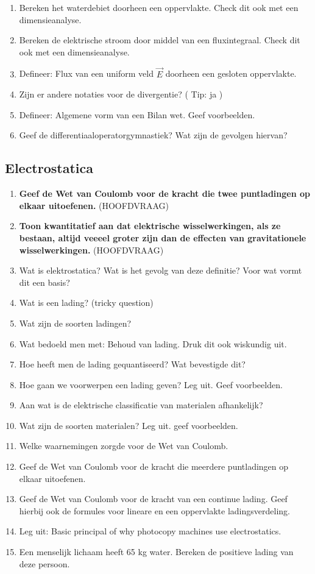 \documentclass[12pt]{article}
\begin{document}
\begin{enumerate}
        \item Bereken het waterdebiet doorheen een oppervlakte. Check dit ook met een dimensieanalyse.
        \item Bereken de elektrische stroom door middel van een fluxintegraal. Check dit ook met een dimensieanalyse.
        \item Defineer: Flux van een uniform veld $\vec{E}$ doorheen een gesloten oppervlakte.
        \item Zijn er andere notaties voor de divergentie? ( Tip: ja )
        \item Defineer: Algemene vorm van een Bilan wet. Geef voorbeelden.
        \item Geef de differentiaaloperatorgymnastiek? Wat zijn de gevolgen hiervan?
    \end{enumerate}
    \subsection{Electrostatica}
    \begin{enumerate}
        \item \textbf{Geef de Wet van Coulomb voor de kracht die twee puntladingen op elkaar uitoefenen.} (HOOFDVRAAG)
        \item \textbf{Toon kwantitatief aan dat elektrische wisselwerkingen, als ze bestaan, altijd veeeel groter zijn dan de effecten van gravitationele wisselwerkingen.} (HOOFDVRAAG)
        \item Wat is elektrostatica? Wat is het gevolg van deze definitie? Voor wat vormt dit een basis? 
        \item Wat is een lading? (tricky question)
        \item Wat zijn de soorten ladingen?
        \item Wat bedoeld men met: Behoud van lading. Druk dit ook wiskundig uit.
        \item Hoe heeft men de lading gequantiseerd? Wat bevestigde dit?
        \item Hoe gaan we voorwerpen een lading geven? Leg uit. Geef voorbeelden.
        \item Aan wat is de elektrische classificatie van materialen afhankelijk?
        \item Wat zijn de soorten materialen? Leg uit. geef voorbeelden.
        \item Welke waarnemingen zorgde voor de Wet van Coulomb.
        \item Geef de Wet van Coulomb voor de kracht die meerdere puntladingen op elkaar uitoefenen.
        \item Geef de Wet van Coulomb voor de kracht van een continue lading. Geef hierbij ook de formules voor lineare en een oppervlakte ladingsverdeling.
        \item Leg uit: Basic principal of why photocopy machines use electrostatics.
        \item Een menselijk lichaam heeft 65 kg water. Bereken de positieve lading van deze persoon.
    \end{enumerate}
\end{document}
